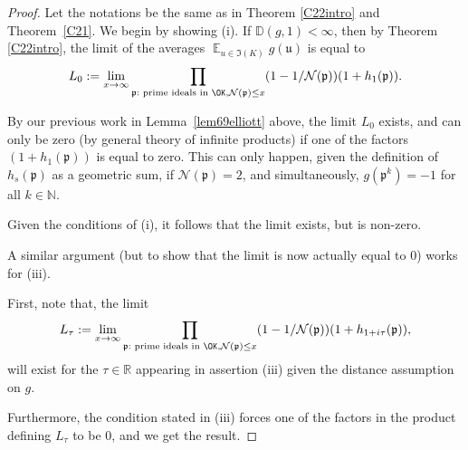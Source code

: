 \documentclass[11pt]{amsart}
\theoremstyle{definition}
\DeclareMathOperator*{\E}{\mathbb{E}}
\newcommand{\D}{{\mathbb D}}
\newcommand{\N}{{\mathbb N}}
\newcommand{\NN}{{\mathcal N}}
\newcommand{\R}{{\mathbb R}}
\newcommand{\mf}{\mathfrak}
\begin{document}
\begin{proof}
Let the notations be the same as in Theorem \ref{C22intro} and Theorem~\ref{C21}. We begin by showing (i). If $\D(g,1)<\infty$, then by Theorem \ref{C22intro}, the limit of the averages $\E_{u \in \mf I(K)} g(\mf u)$ is equal to
\[
L_0:=\lim_{x \to \infty} \prod_{\mf p: \text{ prime ideals in }\OK, \NN(\mf p) \leq x}(1-1/\NN(\mf p))(1+h_1(\mf p)).
\]

By our previous work in Lemma~\ref{lem69elliott} above, the limit $L_0$ exists, and can only be zero (by general theory of infinite products) if one of the factors $(1+h_1(\mf p))$ is equal to zero. This can only happen, given the definition of $h_s(\mf p)$ as a geometric sum, if $\NN(\mf p)=2$, and simultaneously, $g(\mf p^k)=-1$ for all $k \in \N$.

Given the conditions of (i), it follows that the limit exists, but is non-zero.

A similar argument (but to show that the limit is now actually equal to $0$) works for (iii).

First, note that, the limit
\[
L_{\tau}:=\lim_{x \to \infty} \prod_{\mf p: \text{ prime ideals in }\OK, \NN(\mf p) \leq x}(1-1/\NN(\mf p))(1+h_{1+i\tau}(\mf p)),
\]
will exist for the $\tau \in \R$ appearing in assertion (iii) given the distance assumption on $g$.

Furthermore, the condition stated in (iii) forces one of the factors in the product defining $L_{\tau}$ to be $0$, and we get the result.


\end{proof}
\end{document}
